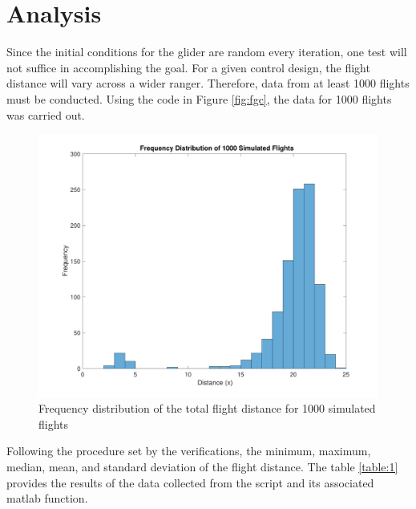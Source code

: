 \documentclass[12pt]{article}
\begin{document}
\section{Analysis}
\label{secAnalysis}
Since the initial conditions for the glider are random every iteration, one test will not suffice in accomplishing the goal. For a given control design, the flight distance will vary across a wider ranger. Therefore, data from at least 1000 flights must be conducted. Using the code in Figure \ref{fig:fgc}, the data for 1000 flights was carried out. 
\begin{figure}[H]
\includegraphics[width=1\textwidth]{flights1.pdf}
\caption{Frequency distribution of the total flight distance for 1000 simulated flights}
\label{hist}
\end{figure}
Following the procedure set by the verifications, the minimum, maximum, median, mean, and standard deviation of the flight distance. The table \ref{table:1} provides the results of the data collected from the script and its associated matlab function.
 
\end{document}
